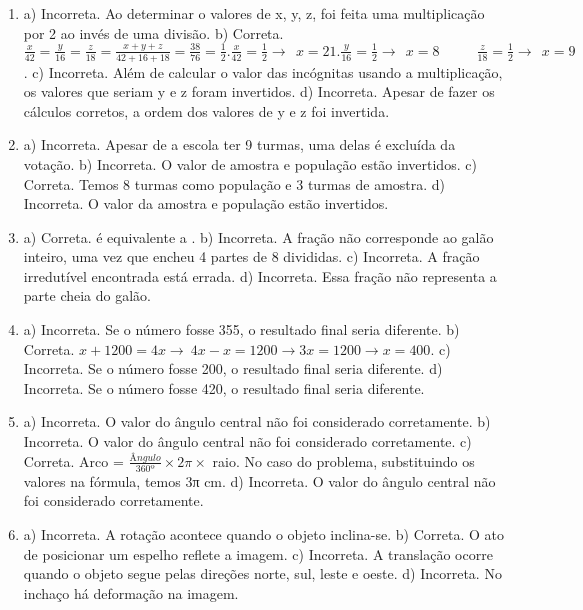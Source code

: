 \begin{enumerate}
\item a) Incorreta. Ao determinar o valores de x, y, z, foi feita uma multiplicação por 2 ao invés de uma divisão.
b) Correta. $\frac{x}{42} = \frac{y}{16} = \frac{z}{18} = \frac{x + y + z}{42 + 16 + 18} = \frac{38}{76} = \frac{1}{2}. \frac{x}{42} = \frac{1}{2} \rightarrow \ \ x = 21. \frac{y}{16} = \frac{1}{2} \rightarrow \ \ x = 8\ \ \ \ \ \ \ \ \ \ \ \ \frac{z}{18} = \frac{1}{2} \rightarrow \ \ x = 9$.
c) Incorreta. Além de calcular o valor das incógnitas usando a multiplicação, os valores que seriam y e z foram invertidos.
d) Incorreta. Apesar de fazer os cálculos corretos, a ordem dos valores de y e z foi invertida.

\item a) Incorreta. Apesar de a escola ter 9 turmas, uma delas é excluída da votação.
b) Incorreta. O valor de amostra e população estão invertidos.
c) Correta. Temos 8 turmas como população e 3 turmas de amostra.
d) Incorreta. O valor da amostra e população estão invertidos.


\item a)  Correta.   é equivalente a .
b)  Incorreta. A fração não corresponde ao galão inteiro, uma vez que encheu 4 partes de 8 divididas.
c) Incorreta. A fração irredutível encontrada está errada.
d) Incorreta. Essa fração não representa a parte cheia do galão.


\item a) Incorreta. Se o número fosse 355, o resultado final seria diferente.
b) Correta.
$x + 1200 = 4x \rightarrow \ 4x - x = 1200 \rightarrow 3x = 1200 \rightarrow x = 400$.
c) Incorreta. Se o número fosse 200, o resultado final seria diferente.
d) Incorreta. Se o número fosse 420, o resultado final seria diferente.

\item a) Incorreta. O valor do ângulo central não foi considerado corretamente.
b) Incorreta. O valor do ângulo central não foi considerado corretamente.
c) Correta. Arco = $\frac {Ângulo}{360º} \times 2π \times$ raio.
No caso do problema, substituindo os valores na fórmula, temos 3π cm.
d) Incorreta. O valor do ângulo central não foi considerado corretamente.

\item a) Incorreta. A rotação acontece quando o objeto inclina-se.
b) Correta. O ato de posicionar um espelho reflete a imagem.
c) Incorreta. A translação ocorre quando o objeto segue pelas direções norte, sul, leste e oeste.
d) Incorreta. No inchaço há deformação na imagem.



\end{enumerate}
